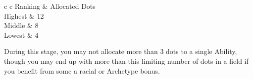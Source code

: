 \begin{center}
	\small
	\begin{rndtable}{c c}
	Ranking &  Allocated Dots \\
	Highest & 12
	\\
	Middle 	&	8
	\\
	Lowest & 4
	\end{rndtable}
\end{center}


During this stage, you may not allocate more than 3 dots to a single Ability, though you may end up with more than this limiting number of dots in a field if you benefit from some a racial or Archetype bonus. 


